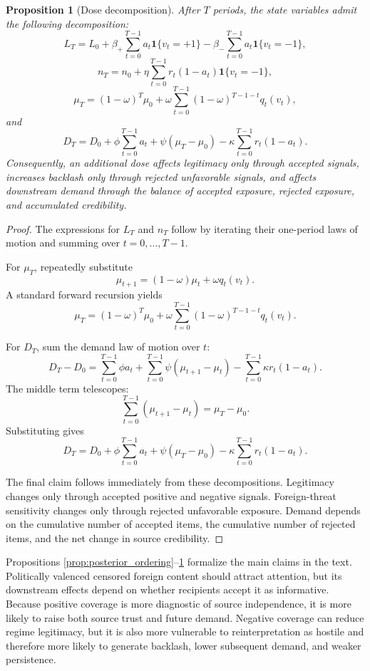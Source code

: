 \documentclass[12pt,american]{article}
\newtheorem{proposition}{Proposition}
\begin{document}
\begin{refsection}
		\begin{proposition}[Dose decomposition]
			\label{prop:dose_decomposition}
			After \(T\) periods, the state variables admit the following decomposition:
			\[
			L_T
			=
			L_0
			+
			\beta_+ \sum_{t=0}^{T-1} a_t \mathbf{1}\{v_t=+1\}
			-
			\beta_- \sum_{t=0}^{T-1} a_t \mathbf{1}\{v_t=-1\},
			\]
			\[
			n_T
			=
			n_0
			+
			\eta \sum_{t=0}^{T-1} r_t(1-a_t)\mathbf{1}\{v_t=-1\},
			\]
			\[
			\mu_T
			=
			(1-\omega)^T\mu_0
			+
			\omega \sum_{t=0}^{T-1}(1-\omega)^{T-1-t} q_t(v_t),
			\]
			and
			\[
			D_T
			=
			D_0
			+
			\phi \sum_{t=0}^{T-1} a_t
			+
			\psi(\mu_T-\mu_0)
			-
			\kappa \sum_{t=0}^{T-1} r_t(1-a_t).
			\]
				Consequently, an additional dose affects legitimacy only through accepted signals, increases backlash only through rejected unfavorable signals, and affects downstream demand through the balance of accepted exposure, rejected exposure, and accumulated credibility.
		\end{proposition}
		
		\begin{proof}
			The expressions for \(L_T\) and \(n_T\) follow by iterating their one-period laws of motion and summing over \(t=0,\dots,T-1\).
			
			For \(\mu_T\), repeatedly substitute
			\[
			\mu_{t+1}=(1-\omega)\mu_t+\omega q_t(v_t).
			\]
			A standard forward recursion yields
			\[
			\mu_T
			=
			(1-\omega)^T\mu_0
			+
			\omega \sum_{t=0}^{T-1}(1-\omega)^{T-1-t} q_t(v_t).
			\]
			
			For \(D_T\), sum the demand law of motion over \(t\):
			\[
			D_T-D_0
			=
			\sum_{t=0}^{T-1}\phi a_t
			+
			\sum_{t=0}^{T-1}\psi(\mu_{t+1}-\mu_t)
			-
			\sum_{t=0}^{T-1}\kappa r_t(1-a_t).
			\]
			The middle term telescopes:
			\[
			\sum_{t=0}^{T-1}(\mu_{t+1}-\mu_t)=\mu_T-\mu_0.
			\]
			Substituting gives
			\[
			D_T
			=
			D_0
			+
			\phi \sum_{t=0}^{T-1} a_t
			+
			\psi(\mu_T-\mu_0)
			-
			\kappa \sum_{t=0}^{T-1} r_t(1-a_t).
			\]
			
				The final claim follows immediately from these decompositions. Legitimacy changes only through accepted positive and negative signals. Foreign-threat sensitivity changes only through rejected unfavorable exposure. Demand depends on the cumulative number of accepted items, the cumulative number of rejected items, and the net change in source credibility.
		\end{proof}
		
		Propositions \ref{prop:posterior_ordering}--\ref{prop:dose_decomposition} formalize the main claims in the text. Politically valenced censored foreign content should attract attention, but its downstream effects depend on whether recipients accept it as informative. Because positive coverage is more diagnostic of source independence, it is more likely to raise both source trust and future demand. Negative coverage can reduce regime legitimacy, but it is also more vulnerable to reinterpretation as hostile and therefore more likely to generate backlash, lower subsequent demand, and weaker persistence.
		
	\end{refsection}
	
\end{document}
